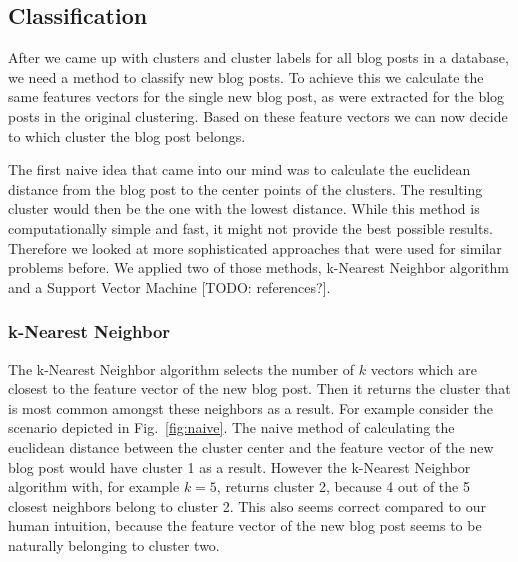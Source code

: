 
\subsection{Classification}
\label{sec:classification}

After we came up with clusters and cluster labels for all blog posts in a database, we need a method to classify new blog posts. %
To achieve this we calculate the same features vectors for the single new blog post, as were extracted for the blog posts in the original clustering.
Based on these feature vectors we can now decide to which cluster the blog post belongs.


The first naive idea that came into our mind was to calculate the euclidean distance from the blog post to the center points of the clusters.
The resulting cluster would then be the one with the lowest distance.
While this method is computationally simple and fast, it might not provide the best possible results.
Therefore we looked at more sophisticated approaches that were used for similar problems before.
We applied two of those methods, k-Nearest Neighbor algorithm and a Support Vector Machine [TODO: references?].


\subsubsection{k-Nearest Neighbor}
\label{sec:k_nearest_neighbor}


The k-Nearest Neighbor algorithm selects the number of $k$ vectors which are closest to the feature vector of the new blog post.
Then it returns the cluster that is most common amongst these neighbors as a result. 
For example consider the scenario depicted in Fig.~\ref{fig:naive}.
The naive method of calculating the euclidean distance between the cluster center and the feature vector of the new blog post would have cluster 1 as a result.
However the k-Nearest Neighbor algorithm with, for example $k=5$, returns cluster 2, because 4 out of the 5 closest neighbors belong to cluster 2.
This also seems correct compared to our human intuition, because the feature vector of the new blog post seems to be naturally belonging to cluster two.


